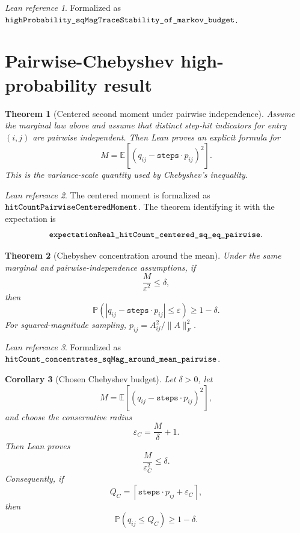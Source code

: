 \documentclass[11pt]{article}
\newcommand{\Frob}[1]{\lVert #1\rVert_F}
\newcommand{\Prob}{\mathbb{P}}
\newcommand{\E}{\mathbb{E}}
\newcommand{\lean}[1]{\texttt{\detokenize{#1}}}
\newtheorem{theorem}{Theorem}
\newtheorem{corollary}[theorem]{Corollary}
\theoremstyle{definition}
\theoremstyle{remark}
\newtheorem*{leanref}{Lean reference}
\begin{document}
\begin{leanref}
Formalized as
\(\lean{highProbability_sqMagTraceStability_of_markov_budget}\).
\end{leanref}

\section*{Pairwise-Chebyshev high-probability result}

\begin{theorem}[Centered second moment under pairwise independence]
Assume the marginal law above and assume that distinct step-hit indicators for
entry \((i,j)\) are pairwise independent. Then Lean proves an explicit formula
for
\[
  M =
  \E\left[
    \left(q_{ij}-\texttt{steps}\cdot p_{ij}\right)^2
  \right].
\]
This is the variance-scale quantity used by Chebyshev's inequality.
\end{theorem}

\begin{leanref}
The centered moment is formalized as
\(\lean{hitCountPairwiseCenteredMoment}\). The theorem identifying it with the
expectation is
\[
  \lean{expectationReal_hitCount_centered_sq_eq_pairwise}.
\]
\end{leanref}

\begin{theorem}[Chebyshev concentration around the mean]
Under the same marginal and pairwise-independence assumptions, if
\[
  \frac{M}{\varepsilon^2} \le \delta,
\]
then
\[
  \Prob\left(
    \left|
      q_{ij} - \texttt{steps}\cdot p_{ij}
    \right|
    \le \varepsilon
  \right)
  \ge 1-\delta.
\]
For squared-magnitude sampling, \(p_{ij}=A_{ij}^2/\Frob{A}^2\).
\end{theorem}

\begin{leanref}
Formalized as
\(\lean{hitCount_concentrates_sqMag_around_mean_pairwise}\).
\end{leanref}

\begin{corollary}[Chosen Chebyshev budget]
Let \(\delta>0\), let
\[
  M =
  \E\left[
    \left(q_{ij}-\texttt{steps}\cdot p_{ij}\right)^2
  \right],
\]
and choose the conservative radius
\[
  \varepsilon_C = \frac{M}{\delta}+1.
\]
Then Lean proves
\[
  \frac{M}{\varepsilon_C^2} \le \delta.
\]
Consequently, if
\[
  Q_C =
  \left\lceil
    \texttt{steps}\cdot p_{ij}+\varepsilon_C
  \right\rceil,
\]
then
\[
  \Prob(q_{ij} \le Q_C) \ge 1-\delta.
\]
\end{corollary}
\end{document}
